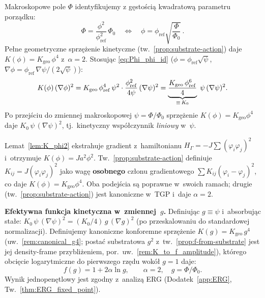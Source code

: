 Makroskopowe pole $\Phi$ identyfikujemy z gęstością kwadratową
parametru porządku:
\begin{equation}
  \Phi = \frac{\phi^2}{\phi_\mathrm{ref}^2}\,\Phi_0
  \quad\Longleftrightarrow\quad
  \phi = \phi_\mathrm{ref}\sqrt{\frac{\Phi}{\Phi_0}}\,.
  \label{eq:Phi_phi_id}
\end{equation}
Pełne geometryczne sprzężenie kinetyczne
(tw.~\ref{prop:substrate-action}) daje
$K(\phi) = K_\mathrm{geo}\,\phi^4$ z~$\alpha = 2$.
Stosując \eqref{eq:Phi_phi_id} ($\phi = \phi_\mathrm{ref}\sqrt{\psi}$,
$\nabla\phi = \phi_\mathrm{ref}\,\nabla\psi/(2\sqrt{\psi})$):
\begin{equation}
  K(\phi)\,(\nabla\phi)^2
  = K_\mathrm{geo}\,\phi_\mathrm{ref}^4\,\psi^2
    \cdot \frac{\phi_\mathrm{ref}^2}{4\psi}\,(\nabla\psi)^2
  = \underbrace{\frac{K_\mathrm{geo}\,\phi_\mathrm{ref}^6}{4}}_{%
    \equiv\,K_0}\;\psi\,(\nabla\psi)^2.
  \label{eq:kinetic_macro}
\end{equation}
Po przejściu do zmiennej makroskopowej $\psi = \Phi/\Phi_0$
sprzężenie $K(\phi) = K_\mathrm{geo}\phi^4$ daje
$K_0\,\psi\,(\nabla\psi)^2$, tj.\ kinetyczny współczynnik
\emph{liniowy} w~$\psi$.

\begin{uwaga}
Lemat~\ref{lem:K_phi2} ekstrahuje gradient z~hamiltonianu
$H_\Gamma = -J\!\sum(\varphi_i\varphi_j)^2$ i~otrzymuje
$K(\phi) = Ja^2\phi^2$. Tw.~\ref{prop:substrate-action}
definiuje $K_{ij} = J(\varphi_i\varphi_j)^2$ jako wagę
\textbf{osobnego} członu gradientowego
$\sum K_{ij}(\varphi_i{-}\varphi_j)^2$, co daje
$K(\phi) = K_\mathrm{geo}\phi^4$.
Oba podejścia są poprawne w~swoich ramach; drugie
(tw.~\ref{prop:substrate-action}) jest kanoniczne w~TGP
i~daje $\alpha = 2$.
\end{uwaga}

\medskip\noindent
\textbf{Efektywna funkcja kinetyczna w~zmiennej~$g$.}
Definiując $g \equiv \psi$ i~absorb\-ując stałe:
$K_0\,\psi\,(\nabla\psi)^2 = (K_0/4)\,g\,(\nabla g)^2$
(po przeskalowaniu do standardowej normalizacji).
Definiujemy kanoniczne konforemne sprzężenie $K(g) = K_\mathrm{geo}\,g^4$
(uw.~\ref{rem:canonical_g4}; postać substratowa $g^2$ z~tw.~\ref{prop:f-from-substrate}
jest jej density-frame przybliżeniem, por.\ uw.~\ref{rem:K_to_f_amplitude}), którego obcięcie
logarytmiczne do pierwszego rzędu wokół $g = 1$ daje:
\begin{equation}
  \boxed{f(g) = 1 + 2\alpha\ln g,\qquad \alpha = 2,\quad g = \Phi/\Phi_0.}
  \label{eq:K_eff_1loop}
\end{equation}
Wynik jednopenętlowy jest zgodny z~analizą ERG
(Dodatek~\ref{app:ERG}, Tw.~\ref{thm:ERG_fixed_point}).

